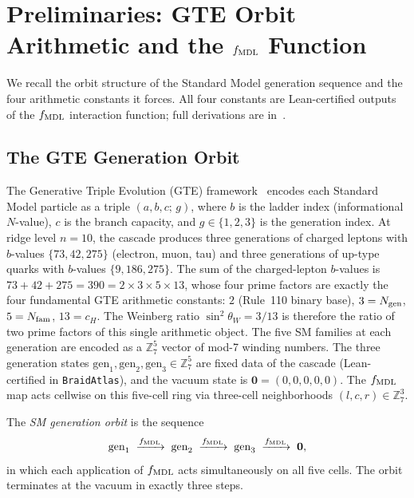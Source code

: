 \documentclass[11pt]{article}
\theoremstyle{remark}
\newcommand{\Ngen}{N_{\rm gen}}
\newcommand{\Nfam}{N_{\rm fam}}
\newcommand{\cH}{c_H}
\newcommand{\sinwsq}{\sin^2\!\theta_W}
\begin{document}
\section{Preliminaries: GTE Orbit Arithmetic and the \texorpdfstring{$f_{\rm MDL}$}{fMDL} Function}
\label{sec:prelim}

We recall the orbit structure of the Standard Model generation sequence and the four
arithmetic constants it forces.  All four constants are Lean-certified outputs of the
$f_{\rm MDL}$ interaction function; full derivations are
in~\cite{SpivackCompUniversality,Spivack2026_SM_UGP}.

\subsection{The GTE Generation Orbit}
\label{sec:prelim_orbit}

The Generative Triple Evolution (GTE) framework~\cite{Spivack2026_SM_UGP} encodes each
Standard Model particle as a triple $(a, b, c;\, g)$, where $b$ is the ladder index
(informational $N$-value), $c$ is the branch capacity, and $g \in \{1,2,3\}$ is the
generation index.
At ridge level $n = 10$, the cascade produces three generations of charged leptons with
$b$-values $\{73, 42, 275\}$ (electron, muon, tau) and three generations of up-type quarks
with $b$-values $\{9, 186, 275\}$.
The sum of the charged-lepton $b$-values is $73 + 42 + 275 = 390 = 2\times 3\times 5\times 13$,
whose four prime factors are exactly the four fundamental GTE arithmetic constants:
$2$ (Rule~110 binary base), $3 = \Ngen$, $5 = \Nfam$, $13 = \cH$.
The Weinberg ratio $\sinwsq = 3/13$ is therefore the ratio of two prime factors of this single
arithmetic object.
The five SM families at each generation are encoded as a $\mathbb{Z}_7^5$ vector of
mod-7 winding numbers.
The three generation states $\mathrm{gen}_1, \mathrm{gen}_2, \mathrm{gen}_3 \in
\mathbb{Z}_7^5$ are fixed data of the cascade (Lean-certified in \texttt{BraidAtlas}),
and the vacuum state is $\mathbf{0} = (0,0,0,0,0)$.
The $f_{\rm MDL}$ map acts cellwise on this five-cell ring via three-cell
neighborhoods $(l, c, r) \in \mathbb{Z}_7^3$.

The \emph{SM generation orbit} is the sequence
\begin{equation}
  \mathrm{gen}_1 \;\xrightarrow{f_{\rm MDL}}\; \mathrm{gen}_2
  \;\xrightarrow{f_{\rm MDL}}\; \mathrm{gen}_3
  \;\xrightarrow{f_{\rm MDL}}\; \mathbf{0},
  \label{eq:orbit}
\end{equation}
in which each application of $f_{\rm MDL}$ acts simultaneously on all five cells.
The orbit terminates at the vacuum in exactly three steps.
\end{document}
